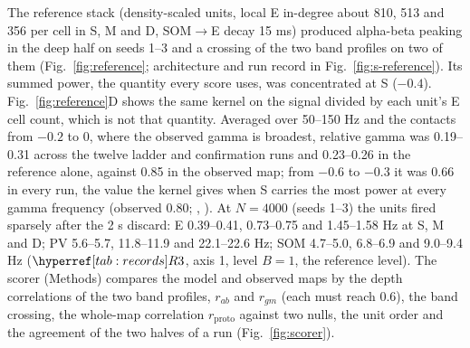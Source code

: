 The reference stack (density-scaled units, local E in-degree about 810, 513 and 356 per cell in S, M and D,
SOM$\to$E decay 15 ms) produced alpha-beta peaking in the deep half on seeds 1--3 and a crossing of the two band profiles on two of them
(Fig.~\ref{fig:reference}; architecture and run record in Fig.~\ref{fig:s-reference}). Its summed power, the quantity every score uses, was concentrated at S ($-0.4$). Fig.~\ref{fig:reference}D shows the same kernel on the signal divided by each unit's E cell count, which is not that quantity.
Averaged over 50--150 Hz and the
contacts from $-0.2$ to 0, where the observed gamma is broadest, relative gamma was 0.19--0.31 across the twelve
ladder and confirmation runs and 0.23--0.26 in the reference alone, against 0.85 in the observed map; from $-0.6$ to $-0.3$ it was 0.66 in every
run, the value the kernel gives when S carries the most power at every gamma frequency (observed 0.80; ,
). At $N = 4000$ (seeds 1--3) the units fired sparsely after the 2 s discard: E 0.39--0.41, 0.73--0.75
and 1.45--1.58 Hz at S, M and D; PV 5.6--5.7, 11.8--11.9 and 22.1--22.6 Hz; SOM 4.7--5.0, 6.8--6.9 and 9.0--9.4 Hz
($\rec{R3}$, axis 1, level $B = 1$, the reference level). The scorer (Methods) compares the model and observed maps by the depth correlations
of the two band profiles, $r_{ab}$ and $r_{gm}$ (each must reach 0.6), the band crossing, the whole-map
correlation $r_\text{proto}$ against two nulls, the unit order and the agreement of the two halves of a run
(Fig.~\ref{fig:scorer}).

